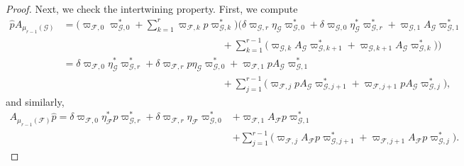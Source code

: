 \documentclass[11pt,reqno]{amsart}
\begin{document}
\begin{proof}
Next, we check the intertwining property. First, we compute
\begin{align*}
\widehat{p}A_{\scriptscriptstyle\mu_{r-1}(\mathcal{G})}&=\biggl(\varpi_{\scriptscriptstyle\mathcal{F},0}\varpi_{\scriptscriptstyle\mathcal{G},0}^* +\sum\limits_{k=1}^r\varpi_{\scriptscriptstyle\mathcal{F},k} p\varpi_{\scriptscriptstyle\mathcal{G},k}^*\biggr)\biggl(\delta\varpi_{\scriptscriptstyle\mathcal{G},r}\eta_{\scriptscriptstyle\mathcal{G}}\varpi_{\scriptscriptstyle\mathcal{G},0}^*+\delta\varpi_{\scriptscriptstyle\mathcal{G},0}\eta^*_{\scriptscriptstyle\mathcal{G}}\varpi_{\scriptscriptstyle\mathcal{G},r}^*+\varpi_{\scriptscriptstyle\mathcal{G},1} A_{\scriptscriptstyle\mathcal{G}}\varpi_{\scriptscriptstyle\mathcal{G},1}^*\\
&\qquad\qquad\qquad\qquad\qquad\qquad\qquad\qquad+\sum\limits_{k=1}^{r-1}\bigl(\varpi_{\scriptscriptstyle\mathcal{G},k} A_\mathcal{G}\varpi_{\scriptscriptstyle\mathcal{G},k+1}^* +\varpi_{\scriptscriptstyle\mathcal{G},k+1} A_\mathcal{G}\varpi_{\scriptscriptstyle\mathcal{G},k}^*\bigr)\biggr)\\
&=\delta\varpi_{\scriptscriptstyle\mathcal{F},0}\eta_{\scriptscriptstyle\mathcal{G}}^*\varpi_{\scriptscriptstyle\mathcal{G},r}^* +\delta\varpi_{\scriptscriptstyle\mathcal{F},r}p\eta_{\scriptscriptstyle\mathcal{G}}\varpi_{\scriptscriptstyle\mathcal{G},0}^* +\varpi_{\scriptscriptstyle\mathcal{F},1}pA_{\scriptscriptstyle\mathcal{G}}\varpi_{\scriptscriptstyle\mathcal{G},1}^*\\
&\qquad\qquad\qquad\qquad\qquad\qquad\qquad\qquad+\sum\limits_{j=1}^{r-1}\bigl(\varpi_{\scriptscriptstyle\mathcal{F},j}pA_{\scriptscriptstyle\mathcal{G}}\varpi_{\scriptscriptstyle\mathcal{G},j+1}^*+\varpi_{\scriptscriptstyle\mathcal{F},j+1}pA_{\scriptscriptstyle\mathcal{G}}\varpi_{\scriptscriptstyle\mathcal{G},j}^*\bigr),
\end{align*}
and similarly,
\begin{align*}
A_{\scriptscriptstyle\mu_{r-1}(\mathcal{F})}\widehat{p}=\delta\varpi_{\scriptscriptstyle\mathcal{F},0}\eta_{\scriptscriptstyle\mathcal{F}}^* p\varpi_{\scriptscriptstyle\mathcal{G},r}^* +\delta\varpi_{\scriptscriptstyle\mathcal{F},r}\eta_{\scriptscriptstyle\mathcal{F}}\varpi_{\scriptscriptstyle\mathcal{G},0}^* &+\varpi_{\scriptscriptstyle\mathcal{F},1}A_{\scriptscriptstyle\mathcal{F}}p\varpi_{\scriptscriptstyle\mathcal{G},1}^*\\
&+\sum\limits_{j=1}^{r-1}\bigl(\varpi_{\scriptscriptstyle\mathcal{F},j}A_{\scriptscriptstyle\mathcal{F}}p\varpi_{\scriptscriptstyle\mathcal{G},j+1}^*+\varpi_{\scriptscriptstyle\mathcal{F},j+1}A_{\scriptscriptstyle\mathcal{F}}p\varpi_{\scriptscriptstyle\mathcal{G},j}^*\bigr).

\end{align*}
\end{proof}
\end{document}

